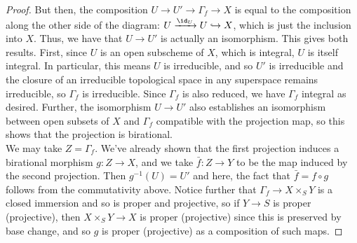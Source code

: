 \begin{proof}
	But then, the composition $U \to U' \to \Gamma_f \to X$ is equal to the composition along the other side of the diagram: $U \xrightarrow{\id_U} U \hookrightarrow X$, which is just the inclusion into $X$. Thus, we have that $U \to U'$ is actually an isomorphism. This gives both results. First, since $U$ is an open subscheme of $X$, which is integral, $U$ is itself integral. In particular, this means $U$ is irreducible, and so $U'$ is irreducible and the closure of an irreducible topological space in any superspace remains irreducible, so $\Gamma_f$ is irreducible. Since $\Gamma_f$ is also reduced, we have $\Gamma_f$ integral as desired. Further, the isomorphism $U \to U'$ also establishes an isomorphism between open subsets of $X$ and $\Gamma_f$ compatible with the projection map, so this shows that the projection is birational. \\
	
	We may take $Z = \Gamma_f$. We've already shown that the first projection induces a birational morphism $g : Z \to X$, and we take $\bar{f} : Z \to Y$ to be the map induced by the second projection. Then $g^{-1}(U) = U'$ and here, the fact that $\bar{f} = f \circ g$ follows from the commutativity above. Notice further that $\Gamma_f \to X \times_S Y$ is a closed immersion and so is proper and projective, so if $Y \to S$ is proper (projective), then $X \times_S Y \to X$ is proper (projective) since this is preserved by base change, and so $g$ is proper (projective) as a composition of such maps.
\end{proof}
